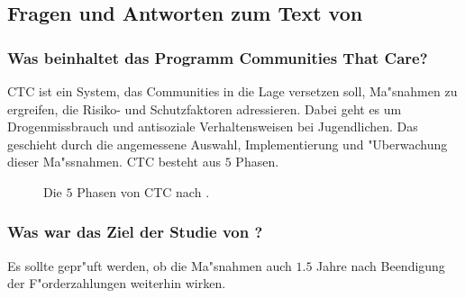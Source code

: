\subsection{Fragen und Antworten zum Text von \textcite{rhew_sustained_2013}}
\subsubsection{Was beinhaltet das Programm Communities That Care?}


CTC ist ein System, das Communities in die Lage versetzen soll, Ma"snahmen zu ergreifen, die Risiko- und Schutzfaktoren adressieren. Dabei geht es um Drogenmissbrauch und antisoziale Verhaltensweisen bei Jugendlichen. Das geschieht durch die angemessene Auswahl, Implementierung und "Uberwachung dieser Ma"ssnahmen. CTC besteht aus $5$ Phasen.

\begin{figure}[<+htpb+>]
        \begin{center}
        \end{center}
        \caption{Die $5$ Phasen von CTC nach \textcite{rhew_sustained_2013}.}
        \label{fig:fuenfphasen}
\end{figure}

\subsubsection{Was war das Ziel der Studie von \textcite{rhew_sustained_2013}?}

Es sollte gepr"uft werden, ob die Ma"snahmen auch $1.5$ Jahre nach Beendigung der F"orderzahlungen weiterhin wirken.

